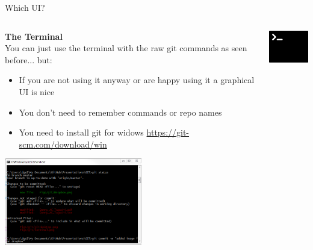 \documentclass[10pt]{beamer}
\begin{document}
{\begin{frame}[fragile]{Which UI?}
\begin{columns}[T]
\begin{column}{.8\textwidth}
\textbf{The Terminal\\}
You can just use the terminal with the raw git commands as seen before... but:
\begin{itemize}
\item If you are not using it anyway or are happy using it a graphical UI is nice 
\item You don't need to remember commands or repo names 
\item You need to install git for widows \url{https://git-scm.com/download/win}
\end{itemize}
\includegraphics[width=6cm]{Figs/git/terminaluse}
\end{column}
\begin{column}{.2\textwidth}
\includegraphics[width=2cm]{Figs/git/terminal} \newline \newline \newline 
\end{column}
\end{columns}
\end{frame}



}
\end{document}

